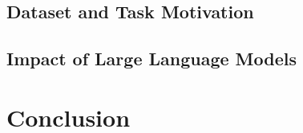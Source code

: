 \documentclass[
10pt, %
a4paper, %
oneside, %
headinclude,footinclude, %
BCOR5mm, %
]{scrartcl}
\begin{document}
\subsection{Dataset and Task Motivation}

\subsection{Impact of Large Language Models}

\section{Conclusion}


\renewcommand{\refname}{\spacedlowsmallcaps{References}} %




\end{document}
